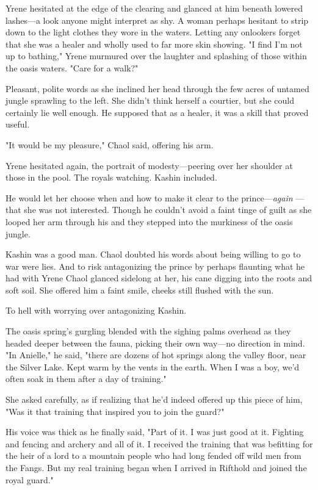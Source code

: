 Yrene hesitated at the edge of the clearing and glanced at him beneath lowered lashes---a look anyone might interpret as shy. A woman perhaps hesitant to strip down to the light clothes they wore in the waters. Letting any onlookers forget that she was a healer and wholly used to far more skin showing. "I find I'm not up to bathing," Yrene murmured over the laughter and splashing of those within the oasis waters. "Care for a walk?"

Pleasant, polite words as she inclined her head through the few acres of untamed jungle sprawling to the left. She didn't think herself a courtier, but she could certainly lie well enough. He supposed that as a healer, it was a skill that proved useful.

"It would be my pleasure," Chaol said, offering his arm.

Yrene hesitated again, the portrait of modesty---peering over her shoulder at those in the pool. The royals watching. Kashin included.

He would let her choose when and how to make it clear to the prince---\emph{again} ---that she was not interested. Though he couldn't avoid a faint tinge of guilt as she looped her arm through his and they stepped into the murkiness of the oasis jungle.

Kashin was a good man. Chaol doubted his words about being willing to go to war were lies. And to risk antagonizing the prince by perhaps flaunting what he had with Yrene  Chaol glanced sidelong at her, his cane digging into the roots and soft soil. She offered him a faint smile, cheeks still flushed with the sun.

To hell with worrying over antagonizing Kashin.

The oasis spring's gurgling blended with the sighing palms overhead as they headed deeper between the fauna, picking their own way---no direction in mind. "In Anielle," he said, "there are dozens of hot springs along the valley floor, near the Silver Lake. Kept warm by the vents in the earth. When I was a boy, we'd often soak in them after a day of training."

She asked carefully, as if realizing that he'd indeed offered up this piece of him, "Was it that training that inspired you to join the guard?"

His voice was thick as he finally said, "Part of it. I was just
 good at it. Fighting and fencing and archery and all of it. I received the training that was befitting for the heir of a lord to a mountain people who had long fended off wild men from the Fangs. But my real training began when I arrived in Rifthold and joined the royal guard."

